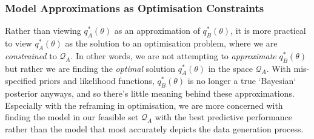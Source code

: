 \documentclass[twoside,11pt]{article}
\newcommand{\KLD}{\operatorname{KLD}}
\DeclareMathOperator*{\argmin}{arg\,min}
\begin{document}
\subsubsection{Model Approximations as Optimisation Constraints}
Rather than viewing $q_A^*(\theta)$ as an approximation of $q_B^*(\theta)$, it is more practical to view $q_A^*(\theta)$ as the solution to an optimisation problem, where we are \textit{constrained} to $\mathcal{Q}_{A}$. In other words, we are not attempting to \textit{approximate} $q_B^*(\theta)$ but rather we are finding the \textit{optimal} solution $q_A^*(\theta)$ in the space $\mathcal{Q}_{A}$. With mis-specified priors and likelihood functions, $q_B^*(\theta)$  is no longer a true `Bayesian` posterior anyways, and so there's little meaning behind these approximations. Especially with the reframing in optimisation, we are more concerned with finding the model in our feasible set $\mathcal{Q}_{A}$ with the best predictive performance rather than the model that most accurately depicts the data generation process.


\end{document}
